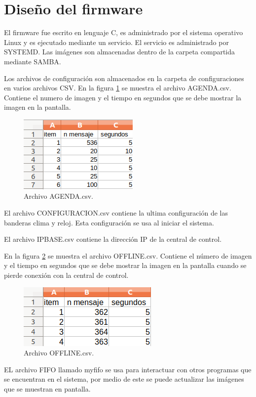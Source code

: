 \section{ Diseño del firmware}
El firmware fue escrito en lenguaje C, es administrado por el sistema operativo Linux y  es ejecutado mediante un servicio. El servicio es administrado por SYSTEMD. Las imágenes son almacenadas  dentro de la carpeta compartida mediante SAMBA. 

Los archivos de configuración son almacenados en la carpeta de configuraciones en varios archivos CSV. En la figura \ref{fig:agendacsv} se muestra el archivo AGENDA.csv. Contiene el numero de imagen y el tiempo en segundos que se debe mostrar la imagen en la pantalla.

\begin{figure}[htpb]
	\centering
    \includegraphics[scale=0.7]{Figures/Agenda.png} 
	\caption{Archivo AGENDA.csv.}
	\label{fig:agendacsv}
\end{figure}


El archivo CONFIGURACION.csv contiene la ultima configuración de las banderas clima y reloj. Esta configuración se usa al iniciar el sistema.

El archivo IPBASE.csv contiene la dirección IP de la central de control.

En la figura \ref{fig:offlinecsv} se muestra el archivo OFFLINE.csv. Contiene el número de imagen y el tiempo en segundos que se debe mostrar la imagen en la pantalla cuando se pierde conexión con la central de control.

\begin{figure}[htpb]
	\centering
	\includegraphics[scale=0.7]{Figures/offline.png} 
	\caption{Archivo OFFLINE.csv.}
	\label{fig:offlinecsv}
\end{figure}
EL archivo FIFO llamado myfifo se usa para interactuar con otros programas que se encuentran en el sistema, por medio de este se puede actualizar las imágenes que se muestran en pantalla.


